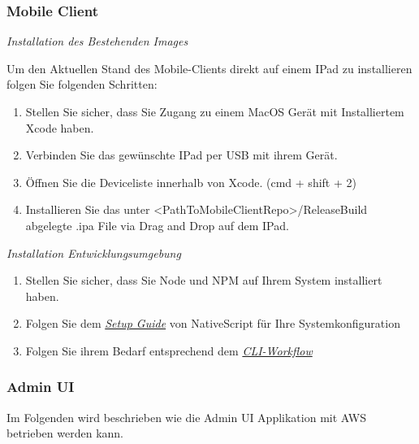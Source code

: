\subsubsection*{Mobile Client}
\textit{Installation des Bestehenden Images}

Um den Aktuellen Stand des Mobile-Clients direkt auf einem IPad zu installieren folgen Sie folgenden Schritten:
\begin{enumerate}
    \item Stellen Sie sicher, dass Sie Zugang zu einem MacOS Gerät mit Installiertem Xcode haben.
    \item Verbinden Sie das gewünschte IPad per USB mit ihrem Gerät.
    \item Öffnen Sie die Deviceliste innerhalb von Xcode. (cmd + shift + 2)
    \item Installieren Sie das unter \textless PathToMobileClientRepo\textgreater /ReleaseBuild abgelegte .ipa File via Drag and Drop auf dem IPad.
\end{enumerate}

\textit{Installation Entwicklungsumgebung}
\begin{enumerate}
    \item Stellen Sie sicher, dass Sie Node und NPM auf Ihrem System installiert haben.
    \item Folgen Sie dem \href{https://docs.nativescript.org/environment-setup.html}{\textit{Setup Guide}} von NativeScript für Ihre Systemkonfiguration \cite{ns-envSetup}
    \item Folgen Sie ihrem Bedarf entsprechend dem \href{https://docs.nativescript.org/development-workflow.html}{\textit{CLI-Workflow}}\cite{ns-cli}
\end{enumerate}

\subsubsection*{Admin UI}

Im Folgenden wird beschrieben wie die Admin UI Applikation mit AWS betrieben werden kann.

